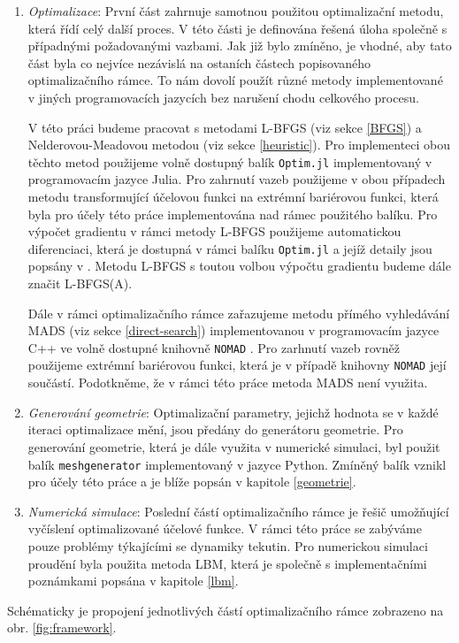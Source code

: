 \begin{enumerate}
	\item \textit{Optimalizace}: První část zahrnuje samotnou použitou optimalizační metodu, která řídí celý další proces. V této části je definována řešená úloha společně s případnými požadovanými vazbami. Jak již bylo zmíněno, je vhodné, aby tato část byla co nejvíce nezávislá na ostaních částech popisovaného optimalizačního rámce. To nám dovolí použít různé metody implementované v jiných programovacích jazycích bez narušení chodu celkového procesu.
	
	V této práci budeme pracovat s metodami L-BFGS (viz sekce \ref{BFGS}) a Nelderovou-Meadovou metodou (viz sekce \ref{heuristic}). Pro implementeci obou těchto metod použijeme volně dostupný balík \texttt{Optim.jl} \cite{Optim.jl} implementovaný v programovacím jazyce Julia. Pro zahrnutí vazeb použijeme v obou případech metodu transformující účelovou funkci na extrémní bariérovou funkci, která byla pro účely této práce implementována nad rámec použitého balíku. Pro výpočet gradientu v rámci metody L-BFGS použijeme automatickou diferenciaci, která je dostupná v rámci balíku \texttt{Optim.jl} a jejíž detaily jsou popsány v \cite{Optim.jl}. Metodu L-BFGS s toutou volbou výpočtu gradientu budeme dále značit L-BFGS(A).
	
	Dále v rámci optimalizačního rámce zařazujeme metodu přímého vyhledávání MADS (viz sekce \ref{direct-search}) implementovanou v programovacím jazyce C++ ve volně dostupné knihovně \texttt{NOMAD} \cite{nomad}. Pro zarhnutí vazeb rovněž použijeme extrémní bariérovou funkci, která je v případě knihovny \texttt{NOMAD} její součástí. Podotkněme, že v rámci této práce metoda MADS není využita.
	
	\item \textit{Generování geometrie}: Optimalizační parametry, jejichž hodnota se v každé iteraci optimalizace mění, jsou předány do generátoru geometrie. Pro generování geometrie, která je dále využita v numerické simulaci, byl použit balík \texttt{meshgenerator} implementovaný v jazyce Python. Zmíněný balík vznikl pro účely této práce a je blíže popsán v kapitole \ref{geometrie}.
	
	\item \textit{Numerická simulace}: Poslední částí optimalizačního rámce je řešič umožňující vyčíslení optimalizované účelové funkce. V rámci této práce se zabýváme pouze problémy týkajícími se dynamiky tekutin. Pro numerickou simulaci proudění byla použita metoda LBM, která je společně s implementačními poznámkami popsána v kapitole \ref{lbm}.
	
\end{enumerate}
Schématicky je propojení jednotlivých částí optimalizačního rámce zobrazeno na obr. \ref{fig:framework}.

